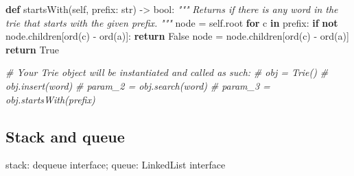 \documentclass[
]{article}
\newenvironment{Shaded}{}{}
\newcommand{\BuiltInTok}[1]{#1}
\newcommand{\CommentTok}[1]{\textcolor[rgb]{0.38,0.63,0.69}{\textit{#1}}}
\newcommand{\ControlFlowTok}[1]{\textcolor[rgb]{0.00,0.44,0.13}{\textbf{#1}}}
\newcommand{\KeywordTok}[1]{\textcolor[rgb]{0.00,0.44,0.13}{\textbf{#1}}}
\newcommand{\NormalTok}[1]{#1}
\newcommand{\OperatorTok}[1]{\textcolor[rgb]{0.40,0.40,0.40}{#1}}
\newcommand{\StringTok}[1]{\textcolor[rgb]{0.25,0.44,0.63}{#1}}
\newcommand{\VariableTok}[1]{\textcolor[rgb]{0.10,0.09,0.49}{#1}}
\begin{document}
\begin{Shaded}
\begin{Highlighting}[]
    \KeywordTok{def}\NormalTok{ startsWith(}\VariableTok{self}\NormalTok{, prefix: }\BuiltInTok{str}\NormalTok{) }\OperatorTok{{-}\textgreater{}} \BuiltInTok{bool}\NormalTok{:}
        \CommentTok{"""}
\CommentTok{        Returns if there is any word in the trie that starts with the given prefix.}
\CommentTok{        """}
\NormalTok{        node }\OperatorTok{=} \VariableTok{self}\NormalTok{.root}
        \ControlFlowTok{for}\NormalTok{ c }\KeywordTok{in}\NormalTok{ prefix:}
            \ControlFlowTok{if} \KeywordTok{not}\NormalTok{ node.children[}\BuiltInTok{ord}\NormalTok{(c) }\OperatorTok{{-}} \BuiltInTok{ord}\NormalTok{(}\StringTok{\textquotesingle{}a\textquotesingle{}}\NormalTok{)]:}
                \ControlFlowTok{return} \VariableTok{False}
\NormalTok{            node }\OperatorTok{=}\NormalTok{ node.children[}\BuiltInTok{ord}\NormalTok{(c) }\OperatorTok{{-}} \BuiltInTok{ord}\NormalTok{(}\StringTok{\textquotesingle{}a\textquotesingle{}}\NormalTok{)]}
        \ControlFlowTok{return} \VariableTok{True}


\CommentTok{\# Your Trie object will be instantiated and called as such:}
\CommentTok{\# obj = Trie()}
\CommentTok{\# obj.insert(word)}
\CommentTok{\# param\_2 = obj.search(word)}
\CommentTok{\# param\_3 = obj.startsWith(prefix)}
\end{Highlighting}
\end{Shaded}

\hypertarget{stack-and-queue}{%
\subsection{Stack and queue}\label{stack-and-queue}}

stack: dequeue interface; queue: LinkedList interface
\end{document}
